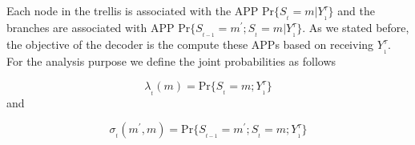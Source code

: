 Each node in the trellis is associated with the APP $\mathrm{Pr}\{S_{_t}=m\vert Y_{_1}^{\tau}\}$ and the branches are associated with APP $\mathrm{Pr}\{S_{_{t-1}}=m^{'};S_{_{t}}=m\vert Y_{_{1}}^{\tau}\}$. As we stated before, the objective of the decoder is the compute these APPs based on receiving $Y_{_{1}}^{\tau}$. \\

For the analysis purpose we define the joint probabilities as follows

\begin{equation}
\lambda_{_{t}}(m)=\mathrm{Pr}\{S_{_{t}}=m;Y_{_{1}}^{\tau}\}
\end{equation}
and

\begin{equation}
\sigma_{_{t}}(m^{'},m)=\mathrm{Pr}\{S_{_{t-1}}=m^{'};S_{_{t}}=m;Y_{_{1}}^{\tau}\}
\end{equation}

